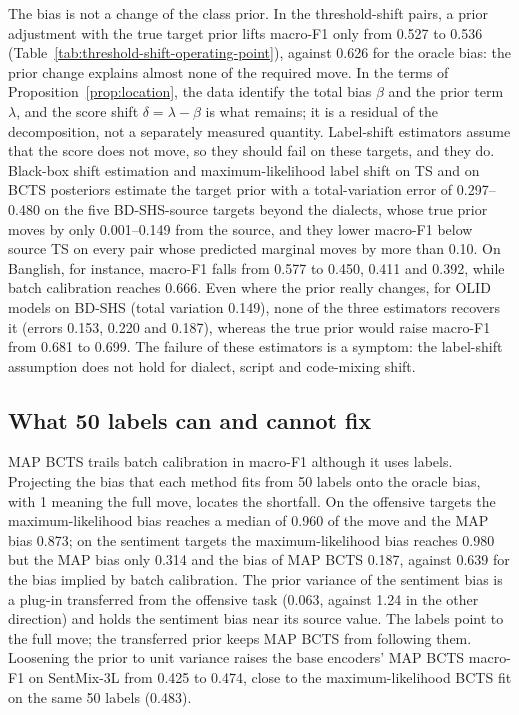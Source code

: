 The bias is not a change of the class prior. In the threshold-shift pairs, a prior adjustment with the true target
prior lifts macro-F1 only from 0.527 to 0.536 (Table~\ref{tab:threshold-shift-operating-point}), against 0.626 for the
oracle bias: the prior change explains almost none of the required move. In the terms of Proposition~\ref{prop:location}, the data identify the
total bias $\beta$ and the prior term $\lambda$, and the score shift $\delta = \lambda - \beta$ is what remains; it is
a residual of the decomposition, not a separately measured quantity. Label-shift estimators assume that the score does not move, so they
should fail on these targets, and they do. Black-box shift estimation \citep{lipton2018bbse} and maximum-likelihood
label shift \citep{saerens2002adjusting, alexandari2020maximum} on TS and on BCTS posteriors estimate the target prior
with a total-variation error of 0.297--0.480 on the five BD-SHS-source targets beyond the dialects, whose true prior
moves by only 0.001--0.149 from the source, and they lower macro-F1 below source TS on every pair whose predicted
marginal moves by more than 0.10. On Banglish, for instance, macro-F1 falls from 0.577 to 0.450, 0.411 and 0.392, while
batch calibration reaches 0.666. Even where the prior really changes, for OLID models on BD-SHS (total variation
0.149), none of the three estimators recovers it (errors 0.153, 0.220 and 0.187), whereas the true prior would raise
macro-F1 from 0.681 to 0.699. The failure of these estimators is a symptom: the label-shift assumption does not hold
for dialect, script and code-mixing shift.

\subsection{What 50 labels can and cannot fix}
\label{sec:results-few-labels}

MAP BCTS trails batch calibration in macro-F1 although it uses labels. Projecting the bias that each method fits from
50 labels onto the oracle bias, with 1 meaning the full move, locates the shortfall. On the offensive targets the
maximum-likelihood bias reaches a median of 0.960 of the move and the MAP bias 0.873; on the sentiment targets the
maximum-likelihood bias reaches 0.980 but the MAP bias only 0.314 and the bias of MAP BCTS 0.187, against 0.639 for the
bias implied by batch calibration. The prior variance of the sentiment bias is a plug-in transferred from the offensive task
(0.063, against 1.24 in the other direction) and holds the sentiment bias near its source value. The labels point to
the full move; the transferred prior keeps MAP BCTS from following them. Loosening the prior to unit variance raises
the base encoders' MAP BCTS macro-F1 on SentMix-3L from 0.425 to 0.474, close to the maximum-likelihood BCTS fit on
the same 50 labels (0.483).

